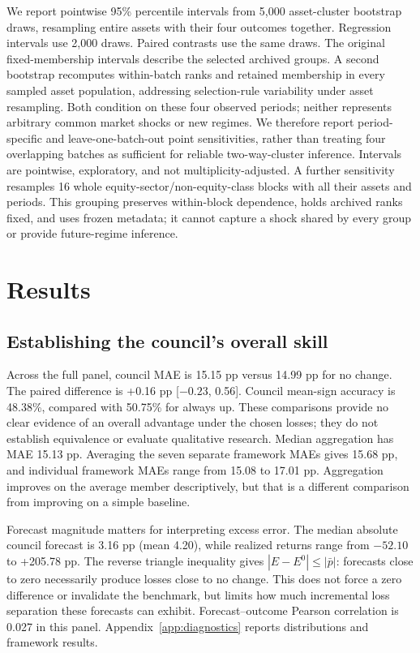 \documentclass[11pt]{article}
\begin{document}
We report pointwise 95\% percentile intervals from 5,000 asset-cluster bootstrap draws, resampling entire assets with their four outcomes together. Regression intervals use 2,000 draws. Paired contrasts use the same draws. The original fixed-membership intervals describe the selected archived groups. A second bootstrap recomputes within-batch ranks and retained membership in every sampled asset population, addressing selection-rule variability under asset resampling. Both condition on these four observed periods; neither represents arbitrary common market shocks or new regimes. We therefore report period-specific and leave-one-batch-out point sensitivities, rather than treating four overlapping batches as sufficient for reliable two-way-cluster inference. Intervals are pointwise, exploratory, and not multiplicity-adjusted. A further sensitivity resamples 16 whole equity-sector/non-equity-class blocks with all their assets and periods. This grouping preserves within-block dependence, holds archived ranks fixed, and uses frozen metadata; it cannot capture a shock shared by every group or provide future-regime inference.

\section{Results}
\subsection{Establishing the council's overall skill}
Across the full panel, council MAE is 15.15 pp versus 14.99 pp for no change. The paired difference is +0.16 pp [$-0.23$, 0.56]. Council mean-sign accuracy is 48.38\%, compared with 50.75\% for always up. These comparisons provide no clear evidence of an overall advantage under the chosen losses; they do not establish equivalence or evaluate qualitative research. Median aggregation has MAE 15.13 pp. Averaging the seven separate framework MAEs gives 15.68 pp, and individual framework MAEs range from 15.08 to 17.01 pp. Aggregation improves on the average member descriptively, but that is a different comparison from improving on a simple baseline.

Forecast magnitude matters for interpreting excess error. The median absolute council forecast is 3.16 pp (mean 4.20), while realized returns range from $-52.10$ to +205.78 pp. The reverse triangle inequality gives $|E-E^0|\leq|\bar p|$: forecasts close to zero necessarily produce losses close to no change. This does not force a zero difference or invalidate the benchmark, but limits how much incremental loss separation these forecasts can exhibit. Forecast--outcome Pearson correlation is 0.027 in this panel. Appendix~\ref{app:diagnostics} reports distributions and framework results.
\end{document}
